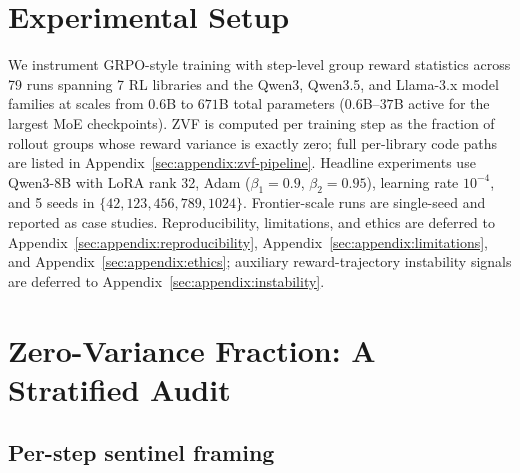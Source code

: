 \documentclass{article}
\begin{document}




\section{Experimental Setup}
\label{sec:setup}

We instrument GRPO-style training with step-level group reward statistics
across 79 runs spanning 7 RL libraries and the Qwen3, Qwen3.5, and Llama-3.x
model families at scales from $0.6$B to $671$B total parameters
($0.6$B--$37$B active for the largest MoE checkpoints). ZVF is computed per
training step as the fraction of rollout groups whose reward variance is
exactly zero; full per-library code paths are listed in
Appendix~\ref{sec:appendix:zvf-pipeline}. Headline experiments use Qwen3-8B with
LoRA rank 32, Adam ($\beta_1{=}0.9$, $\beta_2{=}0.95$), learning rate
$10^{-4}$, and 5 seeds in $\{42,123,456,789,1024\}$. Frontier-scale runs are
single-seed and reported as case studies. Reproducibility,
limitations, and ethics are deferred to
Appendix~\ref{sec:appendix:reproducibility},
Appendix~\ref{sec:appendix:limitations}, and
Appendix~\ref{sec:appendix:ethics}; auxiliary reward-trajectory instability
signals are deferred to Appendix~\ref{sec:appendix:instability}.

\section{Zero-Variance Fraction: A Stratified Audit}
\label{sec:results}

\subsection{Per-step sentinel framing}
\label{sec:zvf-sentinel}
\end{document}
